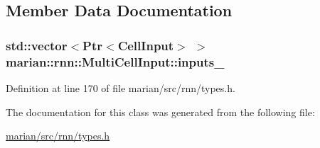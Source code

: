 \subsection{Member Data Documentation}
\subsubsection[{\texorpdfstring{inputs\+\_\+}{inputs_}}]{\setlength{\rightskip}{0pt plus 5cm}std\+::vector$<${\bf Ptr}$<${\bf Cell\+Input}$>$ $>$ marian\+::rnn\+::\+Multi\+Cell\+Input\+::inputs\+\_\+\hspace{0.3cm}{\ttfamily [protected]}}\hypertarget{classmarian_1_1rnn_1_1MultiCellInput_ab01412858661b632d40ea29351859f8e}{}\label{classmarian_1_1rnn_1_1MultiCellInput_ab01412858661b632d40ea29351859f8e}


Definition at line 170 of file marian/src/rnn/types.\+h.



The documentation for this class was generated from the following file\+:\begin{DoxyCompactItemize}
\item 
\hyperlink{marian_2src_2rnn_2types_8h}{marian/src/rnn/types.\+h}\end{DoxyCompactItemize}
